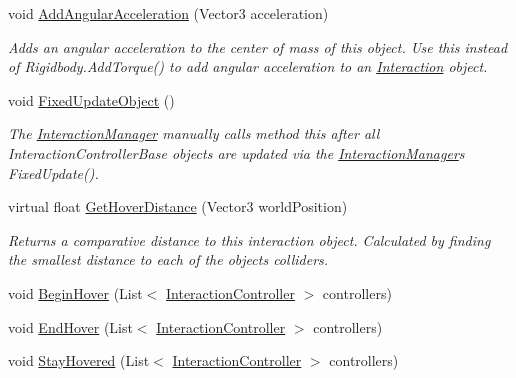 \begin{DoxyCompactItemize}
void \mbox{\hyperlink{class_leap_1_1_unity_1_1_interaction_1_1_interaction_behaviour_a74c47fa3fd3836d15da9d8689377023a}{Add\+Angular\+Acceleration}} (Vector3 acceleration)
\begin{DoxyCompactList}\small\item\em Adds an angular acceleration to the center of mass of this object. Use this instead of Rigidbody.\+Add\+Torque() to add angular acceleration to an \mbox{\hyperlink{namespace_leap_1_1_unity_1_1_interaction}{Interaction}} object. \end{DoxyCompactList}\item 
void \mbox{\hyperlink{class_leap_1_1_unity_1_1_interaction_1_1_interaction_behaviour_a68ff3dbe15847dceb75b97544e634a94}{Fixed\+Update\+Object}} ()
\begin{DoxyCompactList}\small\item\em The \mbox{\hyperlink{class_leap_1_1_unity_1_1_interaction_1_1_interaction_manager}{Interaction\+Manager}} manually calls method this after all Interaction\+Controller\+Base objects are updated via the \mbox{\hyperlink{class_leap_1_1_unity_1_1_interaction_1_1_interaction_manager}{Interaction\+Manager}}\textquotesingle{}s Fixed\+Update(). \end{DoxyCompactList}\item 
virtual float \mbox{\hyperlink{class_leap_1_1_unity_1_1_interaction_1_1_interaction_behaviour_a0f5248395ddcbab62086bd9d2f620d80}{Get\+Hover\+Distance}} (Vector3 world\+Position)
\begin{DoxyCompactList}\small\item\em Returns a comparative distance to this interaction object. Calculated by finding the smallest distance to each of the object\textquotesingle{}s colliders. \end{DoxyCompactList}\item 
void \mbox{\hyperlink{class_leap_1_1_unity_1_1_interaction_1_1_interaction_behaviour_ac25c885f7c0d2ab121c60d1b3b5968c0}{Begin\+Hover}} (List$<$ \mbox{\hyperlink{class_leap_1_1_unity_1_1_interaction_1_1_interaction_controller}{Interaction\+Controller}} $>$ controllers)
\item 
void \mbox{\hyperlink{class_leap_1_1_unity_1_1_interaction_1_1_interaction_behaviour_a1011d32c8a3d054552d47ec44517d22e}{End\+Hover}} (List$<$ \mbox{\hyperlink{class_leap_1_1_unity_1_1_interaction_1_1_interaction_controller}{Interaction\+Controller}} $>$ controllers)
\item 
void \mbox{\hyperlink{class_leap_1_1_unity_1_1_interaction_1_1_interaction_behaviour_a7f9fb570739d3cc9047356abbe21bc44}{Stay\+Hovered}} (List$<$ \mbox{\hyperlink{class_leap_1_1_unity_1_1_interaction_1_1_interaction_controller}{Interaction\+Controller}} $>$ controllers)

\end{DoxyCompactItemize}
